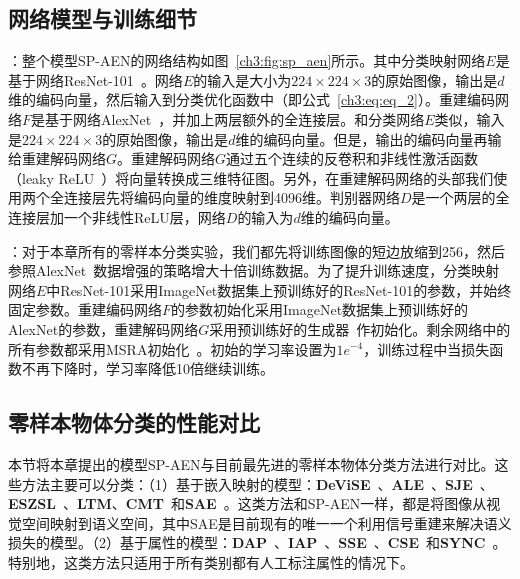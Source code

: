 \subsection{网络模型与训练细节}
\textbf{}：整个模型SP-AEN的网络结构如图~\ref{ch3:fig:sp_aen}所示。其中分类映射网络$E$是基于网络ResNet-101~\cite{he2016deep}。网络$E$的输入是大小为$224\times224\times3$的原始图像，输出是$d$维的编码向量，然后输入到分类优化函数中（即公式~\eqref{ch3:eq:eq_2}）。重建编码网络$F$是基于网络AlexNet~\cite{krizhevsky2012imagenet}，并加上两层额外的全连接层。和分类网络$E$类似，输入是$224\times224\times3$的原始图像，输出是$d$维的编码向量。但是，输出的编码向量再输给重建解码网络$G$。重建解码网络$G$通过五个连续的反卷积和非线性激活函数（leaky ReLU~\cite{he2015delving}）将向量转换成三维特征图。另外，在重建解码网络的头部我们使用两个全连接层先将编码向量的维度映射到4096维。判别器网络$D$是一个两层的全连接层加一个非线性ReLU层，网络$D$的输入为$d$维的编码向量。

\textbf{}：对于本章所有的零样本分类实验，我们都先将训练图像的短边放缩到256，然后参照AlexNet~\cite{krizhevsky2012imagenet}数据增强的策略增大十倍训练数据。为了提升训练速度，分类映射网络$E$中ResNet-101采用ImageNet数据集上预训练好的ResNet-101的参数，并始终固定参数。重建编码网络$F$的参数初始化采用ImageNet数据集上预训练好的AlexNet的参数，重建解码网络$G$采用预训练好的生成器~\cite{dosovitskiy2016generating}作初始化。剩余网络中的所有参数都采用MSRA初始化~\cite{he2015delving}。初始的学习率设置为$1e^{-4}$，训练过程中当损失函数不再下降时，学习率降低10倍继续训练。


\subsection{零样本物体分类的性能对比}
本节将本章提出的模型SP-AEN与目前最先进的零样本物体分类方法进行对比。这些方法主要可以分类：（1）基于嵌入映射的模型：\textbf{DeViSE}~\cite{frome2013devise}、\textbf{ALE}~\cite{akata2015label}、\textbf{SJE}~\cite{akata2015evaluation}、\textbf{ESZSL}~\cite{romera2015embarrassingly}、\textbf{LTM}\cite{xian2016latent}、\textbf{CMT}~\cite{socher2013zero}和\textbf{SAE}~\cite{kodirov2017semantic}。这类方法和SP-AEN一样，都是将图像从视觉空间映射到语义空间，其中SAE是目前现有的唯一一个利用信号重建来解决语义损失的模型。（2）基于属性的模型：\textbf{DAP}~\cite{lampert2009learning}、\textbf{IAP}~\cite{lampert2009learning}、\textbf{SSE}~\cite{zhang2015zero}、\textbf{CSE}~\cite{norouzi2014zero}和\textbf{SYNC}~\cite{changpinyo2016synthesized}。特别地，这类方法只适用于所有类别都有人工标注属性的情况下。

